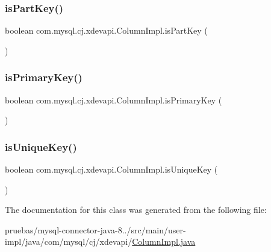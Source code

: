 \subsubsection{\texorpdfstring{is\+Part\+Key()}{isPartKey()}}
{\footnotesize\ttfamily boolean com.\+mysql.\+cj.\+xdevapi.\+Column\+Impl.\+is\+Part\+Key (\begin{DoxyParamCaption}{ }\end{DoxyParamCaption})}

\mbox{\label{classcom_1_1mysql_1_1cj_1_1xdevapi_1_1_column_impl_a56cfe1448b9b4939807627e187a1b9c7}} 
\subsubsection{\texorpdfstring{is\+Primary\+Key()}{isPrimaryKey()}}
{\footnotesize\ttfamily boolean com.\+mysql.\+cj.\+xdevapi.\+Column\+Impl.\+is\+Primary\+Key (\begin{DoxyParamCaption}{ }\end{DoxyParamCaption})}

\mbox{\label{classcom_1_1mysql_1_1cj_1_1xdevapi_1_1_column_impl_a236fda9cc758db2ffba1a03171c1a84d}} 
\subsubsection{\texorpdfstring{is\+Unique\+Key()}{isUniqueKey()}}
{\footnotesize\ttfamily boolean com.\+mysql.\+cj.\+xdevapi.\+Column\+Impl.\+is\+Unique\+Key (\begin{DoxyParamCaption}{ }\end{DoxyParamCaption})}



The documentation for this class was generated from the following file\+:\begin{DoxyCompactItemize}
\item 
pruebas/mysql-\/connector-\/java-\/8../src/main/user-\/impl/java/com/mysql/cj/xdevapi/\mbox{\hyperlink{_column_impl_8java}{Column\+Impl.\+java}}\end{DoxyCompactItemize}
